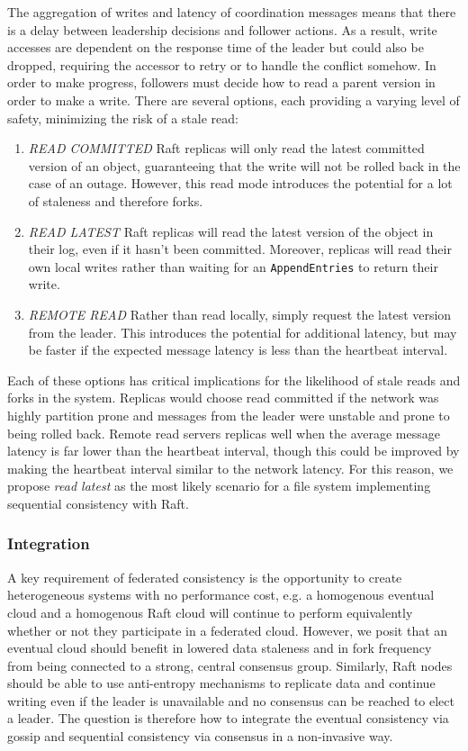 \documentclass{article}
\begin{document}
The aggregation of writes and latency of coordination messages means that there is a delay between leadership decisions and follower actions. As a result, write accesses are dependent on the response time of the leader but could also be dropped, requiring the accessor to retry or to handle the conflict somehow. In order to make progress, followers must decide how to read a parent version in order to make a write. There are several options, each providing a varying level of safety, minimizing the risk of a stale read:

\begin{enumerate}
    \item \textit{READ COMMITTED} Raft replicas will only read the latest committed version of an object, guaranteeing that the write will not be rolled back in the case of an outage. However, this read mode introduces the potential for a lot of staleness and therefore forks.
    \item \textit{READ LATEST} Raft replicas will read the latest version of the object in their log, even if it hasn't been committed. Moreover, replicas will read their own local writes rather than waiting for an \texttt{AppendEntries} to return their write.
    \item \textit{REMOTE READ} Rather than read locally, simply request the latest version from the leader. This introduces the potential for additional latency, but may be faster if the expected message latency is less than the heartbeat interval.
\end{enumerate}

Each of these options has critical implications for the likelihood of stale reads and forks in the system. Replicas would choose read committed if the network was highly partition prone and messages from the leader were unstable and prone to being rolled back. Remote read servers replicas well when the average message latency is far lower than the heartbeat interval, though this could be improved by making the heartbeat interval similar to the network latency. For this reason, we propose \textit{read latest} as the most likely scenario for a file system implementing sequential consistency with Raft.

\subsubsection{Integration}
\label{sec:integration}

A key requirement of federated consistency is the opportunity to create heterogeneous systems with no performance cost, e.g. a homogenous eventual cloud and a homogenous Raft cloud will continue to perform equivalently whether or not they participate in a federated cloud. However, we posit that an eventual cloud should benefit in lowered data staleness and in fork frequency from being connected to a strong, central consensus group. Similarly, Raft nodes should be able to use anti-entropy mechanisms to replicate data and continue writing even if the leader is unavailable and no consensus can be reached to elect a leader. The question is therefore how to integrate the eventual consistency via gossip and sequential consistency via consensus in a non-invasive way.
\end{document}
